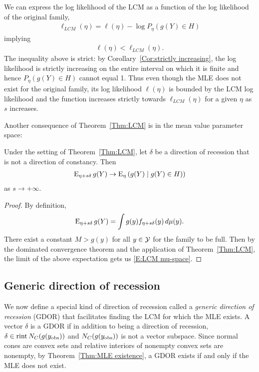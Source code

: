 We can express the log likelihood of the LCM as a function of the 
log likelihood of the original family,
\begin{align} \label{E:LCM ll bound}
 \ell_{LCM}(\eta) = \ell(\eta) - \log P_\eta(g(Y) \in H)
\end{align}
implying
\begin{align*}
	\ell(\eta) < \ell_{LCM}(\eta).	
\end{align*}
The inequality above is strict: by Corollary~\ref{Cor:strictly increasing}, the 
log likelihood is strictly increasing on the entire interval on which it is finite
and hence $P_\eta(g(Y) \in H)$ cannot equal 1.
Thus even though the MLE does not exist for the original family, its log likelihood
$\ell(\eta)$ is bounded by the LCM log likelihood and the function increases strictly
towards $\ell_{LCM}(\eta)$ for a given $\eta$ as $s$ increases.

Another consequence of Theorem~\ref{Thm:LCM} is in the mean value parameter space:
\begin{corollary} \label{Cor:LCM mu-space}
Under the setting of Theorem~\ref{Thm:LCM}, let $\delta$ be a direction of 
recession that is not a direction of constancy.  Then
\begin{align} \label{E:LCM mu-space}
	\operatorname{E}_{\eta+ s\delta} g(Y) \to \operatorname{E}_\eta \left ( g(Y) \mid g(Y) \in H ) \right )
\end{align}
as $s \to +\infty$.
\end{corollary}
\begin{proof}
By definition,
\begin{align*}
	\operatorname{E}_{\eta+ s\delta} g(Y) = \int g(y) f_{\eta+ s\delta}(y) \, d\mu(y).
\end{align*}
There exist a constant $M > g(y)$ for all $y \in {\mathcal Y}$ for the family to
be full.  Then
by the dominated convergence theorem and the application of Theorem~\ref{Thm:LCM}, 
the limit of the above expectation gets us \eqref{E:LCM mu-space}.
\end{proof}

\subsection{Generic direction of recession}
We now define a special kind of direction of recession called a 
\emph{generic direction of recession} (GDOR) that facilitates finding the 
LCM for which the MLE exists.
A vector $\delta$ is a GDOR if in addition to being a direction of recession,  
$\delta \in \operatorname{rint} N_C(g(y_{\text{obs}}))$ and $N_C(g(y_{\text{obs}}))$ is not a vector subspace.
Since normal cones are convex sets and relative interiors of nonempty convex sets 
are nonempty, by Theorem~\ref{Thm:MLE existence},
a GDOR exists if and only if the MLE does not exist.

